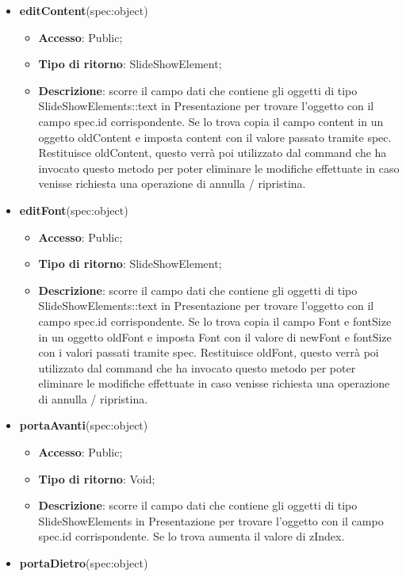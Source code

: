 {\begin{itemize}
\begin{itemize}
			\end{itemize}
			\item \textbf{editContent}(spec:object)
			\begin{itemize}
				\item \textbf{Accesso}: Public;
				\item \textbf{Tipo di ritorno}: SlideShowElement;
				\item \textbf{Descrizione}: scorre il campo dati che contiene gli oggetti di tipo SlideShowElements::text in Presentazione per trovare l’oggetto con il campo spec.id corrispondente. Se lo trova copia il campo content in un oggetto oldContent e imposta content con il valore passato tramite spec. Restituisce oldContent, questo verrà poi utilizzato dal command che ha invocato questo metodo per poter eliminare le modifiche effettuate in caso venisse richiesta una operazione di annulla / ripristina.
			\end{itemize}
			\item \textbf{editFont}(spec:object)
			\begin{itemize}
				\item \textbf{Accesso}: Public;
				\item \textbf{Tipo di ritorno}: SlideShowElement;
				\item \textbf{Descrizione}: scorre il campo dati che contiene gli oggetti di tipo SlideShowElements::text in Presentazione per trovare l’oggetto con il campo spec.id corrispondente. Se lo trova copia il campo Font e fontSize in un oggetto oldFont e imposta Font con il valore di newFont e fontSize con i valori passati tramite spec. Restituisce oldFont, questo verrà poi utilizzato dal command che ha invocato questo metodo per poter eliminare le modifiche effettuate in caso venisse richiesta una operazione di annulla / ripristina.
			\end{itemize}
			\item \textbf{portaAvanti}(spec:object)
			\begin{itemize}
				\item \textbf{Accesso}: Public;
				\item \textbf{Tipo di ritorno}: Void;
				\item \textbf{Descrizione}: scorre il campo dati che contiene gli oggetti di tipo SlideShowElements in Presentazione per trovare l’oggetto con il campo spec.id corrispondente. Se lo trova aumenta il valore di zIndex.
			\end{itemize}
			\item \textbf{portaDietro}(spec:object)

\end{itemize}}
